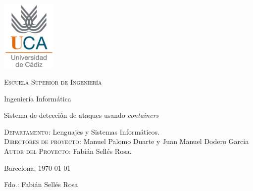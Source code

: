 \thispagestyle{empty}

\includegraphics[width=0.2\textwidth]{images/logouca}

\bigskip
\bigskip
\bigskip
  
  \begin{changemargin}{3em}{3em}

    \begin{center}
      {\Huge \textsc{\nohyphens{Escuela Superior de Ingeniería}}}
      
      \bigskip
      \bigskip
      
      {\huge \nohyphens{Ingeniería Informática}}
      
      \bigskip
      \bigskip
      \bigskip
      \bigskip
      
      {\LARGE \nohyphens{Sistema de detección de ataques usando  \emph{containers}}}
      
      \bigskip
      \bigskip
      \bigskip
      \bigskip
      
    \end{center}
  \end{changemargin}

  \begin{flushleft}
    \Large

    \textsc{Departamento}: \nohyphens{Lenguajes y Sistemas Informáticos.} \\
    \textsc{Directores de proyecto}: \nohyphens{Manuel Palomo Duarte y Juan Manuel Dodero Garcia} \\
    \textsc{Autor del Proyecto}: \nohyphens{Fabián Sellés Rosa}. \\
  \end{flushleft}
  
  \bigskip
  \bigskip
  \bigskip
  
  \begin{flushright}
    \large
    Barcelona, \today
    
    Fdo.: Fabián Sellés Rosa
    
  \end{flushright}

